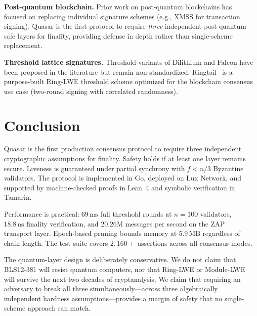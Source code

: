 \documentclass[11pt,a4paper]{article}
\begin{document}
\textbf{Post-quantum blockchain.}
Prior work on post-quantum blockchains has focused on replacing individual
signature schemes (e.g., XMSS for transaction signing). Quasar is the first
protocol to require \emph{three} independent post-quantum-safe layers for
finality, providing defense in depth rather than single-scheme replacement.

\textbf{Threshold lattice signatures.}
Threshold variants of Dilithium and Falcon have been proposed in the
literature but remain non-standardized. Ringtail~\cite{ringtail} is a
purpose-built Ring-LWE threshold scheme optimized for the blockchain consensus
use case (two-round signing with correlated randomness).


\section{Conclusion}
\label{sec:conclusion}

Quasar is the first production consensus protocol to require three independent
cryptographic assumptions for finality. Safety holds if at least one layer
remains secure. Liveness is guaranteed under partial synchrony with $f < n/3$
Byzantine validators. The protocol is implemented in Go, deployed on Lux
Network, and supported by machine-checked proofs in Lean~4 and symbolic
verification in Tamarin.

Performance is practical: $69\,\text{ms}$ full threshold rounds at $n=100$
validators, $18.8\,\text{ns}$ finality verification, and $20.26$M messages
per second on the ZAP transport layer. Epoch-based pruning bounds memory at
$5.9\,\text{MB}$ regardless of chain length. The test suite covers $2{,}160+$
assertions across all consensus modes.

The quantum-layer design is deliberately conservative. We do not claim that
BLS12-381 will resist quantum computers, nor that Ring-LWE or Module-LWE will
survive the next two decades of cryptanalysis. We claim that requiring an
adversary to break all three simultaneously---across three algebraically
independent hardness assumptions---provides a margin of safety that no
single-scheme approach can match.
\end{document}
